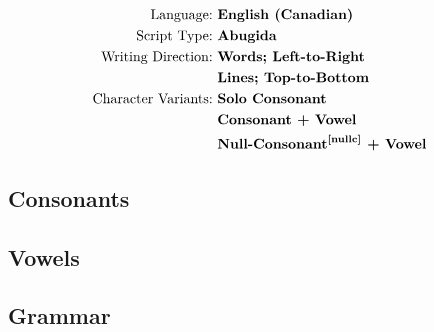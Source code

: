 \label{AbR}
\begin{align*}
\text{Language:}~           & \textbf{English~(Canadian)}             \\
\text{Script Type:}~        & \textbf{Abugida}                        \\
\text{Writing Direction:}~  & \textbf{Words;~Left-to-Right}           \\
                            & \textbf{Lines;~Top-to-Bottom}           \\
\text{Character Variants:}~ & \textbf{Solo~Consonant}                 \\
                            & \textbf{Consonant~+~Vowel}              \\
                            & \textbf{\super{Null-Consonant}{\cite{nullc}}~+~Vowel}%
\end{align*}

\newpage
\subsection{Consonants}


\newpage
\subsection{Vowels}


\newpage
\subsection{Grammar}
